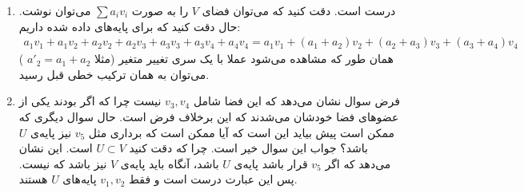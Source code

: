 \begin{enumerate}[wide, labelwidth=!, labelindent=0pt]
    \item درست است.
دقت کنید که می‌توان فضای
$V$
را به صورت
$\sum a_i v_i$
می‌توان نوشت. حال دقت کنید که برای پایه‌های داده شده داریم:
\begin{gather*}
    a_1 v_1 + a_1 v_2 + a_2 v_2 + a_2 v_3 + a_3 v_3 + a_3 v_4 + a_4 v_4 = 
    a_1 v_1 + (a_1 + a_2) v_2 + (a_2 + a_3) v_3 + (a_3 + a_4) v_4
\end{gather*}
همان طور که مشاهده می‌شود عملا با یک سری تغییر متغیر
(مثلا
$a'_2 = a_1 + a_2$
)
می‌توان به همان ترکیب خطی قبل رسید.
    \item فرض سوال نشان می‌دهد که
این فضا شامل
$v_3, v_4$
نیست چرا که اگر بودند یکی از عضو‌های فضا خودشان می‌شدند که این برخلاف فرض است.
حال سوال دیگری که ممکن است پیش بیاید این است که آیا ممکن است که برداری مثل
$v_5$
نیز پایه‌ی
$U$
باشد؟ جواب این سوال خیر است. چرا که دقت کنید
$U \subset V$
است. این نشان می‌دهد که اگر
$v_5$
قرار باشد پایه‌ی
$U$
باشد، آنگاه باید پایه‌‌ی
$V$
نیز باشد که نیست.
پس این عبارت درست است و فقط
$v_1, v_2$
پایه‌های
$U$
هستند.
\end{enumerate}